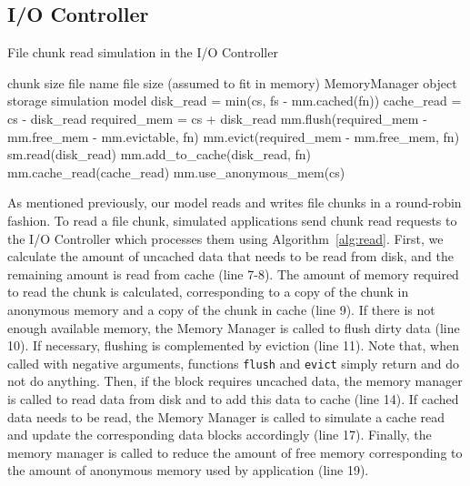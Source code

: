 \documentclass[conference]{IEEEtran}
\newcommand{\Desc}[2]{\State \makebox[2em][l]{#1}#2}
\begin{document}
    \subsection{I/O Controller}

    \begin{algorithm}\caption{File chunk read simulation in the I/O Controller}
    \label{alg:read}
        \small
        \begin{algorithmic}[1]
            \Input
                \Desc{cs}{chunk size}
                \Desc{fn}{file name}
                \Desc{fs}{file size (assumed to fit in memory)}
                \Desc{mm}{MemoryManager object}
                \Desc{sm}{storage simulation model}
               \EndInput
               \State disk\_read = min(cs, fs - mm.cached(fn)) 
               \State cache\_read = cs - disk\_read 
               \State required\_mem = cs + disk\_read
               \State mm.flush(required\_mem - mm.free\_mem - mm.evictable, fn)
               \State mm.evict(required\_mem - mm.free\_mem, fn)
                 
               \State sm.read(disk\_read)
               \State mm.add\_to\_cache(disk\_read, fn)
               \EndIf
                
               \State mm.cache\_read(cache\_read)
            \EndIf
            \State mm.use\_anonymous\_mem(cs)
        \end{algorithmic}
    \end{algorithm}
    As mentioned previously, our model reads and writes file chunks in a
    round-robin fashion. To read a file chunk, simulated applications send
    chunk read requests to the I/O Controller which processes them using
    Algorithm~\ref{alg:read}. First, we calculate the amount of uncached
    data that needs to be read from disk, and the remaining amount is read
    from cache (line 7-8). The amount of memory required to read the chunk
    is calculated, corresponding to a copy of the chunk in anonymous memory
    and a copy of the chunk in cache (line 9).
    If there is not enough available memory, the Memory Manager is called
    to flush dirty data (line 10). If necessary, flushing is complemented by
    eviction (line 11). Note that, when called with negative arguments, functions
    \texttt{flush} and \texttt{evict} simply return and do not do anything. Then,
    if the block requires
    uncached data, the memory manager is called to read data from disk and to add this
    data to cache (line 14).
    If cached data needs to be read, the Memory Manager is called to simulate
    a cache read  and update the corresponding data blocks accordingly (line 17).
    Finally, the memory manager is called to reduce the amount of free memory
    corresponding to the amount of anonymous memory used by application (line 19).
\end{document}
